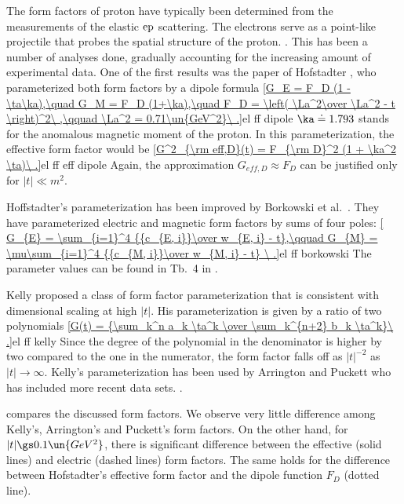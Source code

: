 The form factors of proton have typically been determined from the measurements of the elastic $\rm ep$ scattering. The electrons serve as a point-like projectile that probes the spatial structure of the proton. .
This has been a number of analyses done, gradually accounting for the increasing amount of experimental data. One of the first results was the paper of Hofstadter , who parameterized both form factors by a dipole formula
\eqref{G_E = F_D (1 - \ta\ka),\quad G_M = F_D (1+\ka),\quad F_D = \left( \La^2\over \La^2 - t \right)^2\ ,\qquad \La^2 = 0.71\un{GeV^2}\ .}{el ff dipole}
$\ka\doteq 1.793$ stands for the anomalous magnetic moment of the proton. In this parameterization, the effective form factor would be
\eqref{G^2_{\rm eff,D}(t) = F_{\rm D}^2 (1 + \ka^2 \ta)\ .}{el ff eff dipole}
Again, the approximation $G_{eff,D}\approx F_D$ can be justified only for $|t| \ll m^2$.

Hoffstadter's parameterization has been improved by Borkowski et al.~. They have parameterized electric and magnetic form factors by sums of four poles:
\eqref{
G_{E} = \sum_{i=1}^4 {{c_{E, i}}\over w_{E, i} - t},\qquad
G_{M} = \mu\sum_{i=1}^4 {{c_{M, i}}\over w_{M, i} - t}
\ .}{el ff borkowski}
The parameter values can be found in Tb.~4 in .

Kelly  proposed a class of form factor parameterization that is consistent with dimensional scaling at high $|t|$. His parameterization is given by a ratio of two polynomials
\eqref{G(t) = {\sum_k^n a_k \ta^k \over \sum_k^{n+2} b_k \ta^k}\ .}{el ff kelly}
Since the degree of the polynomial in the denominator is higher by two compared to the one in the numerator, the form factor falls off as $|t|^{-2}$ as $|t|\to\infty$. Kelly's parameterization has been used by Arrington  and Puckett  who has included more recent data sets. .

 compares the discussed form factors. We observe very little difference among Kelly's, Arrington's and Puckett's form factors. On the other hand, for $|t| \gs 0.1\un{GeV^2}$, there is significant difference between the effective (solid lines) and electric (dashed lines) form factors. The same holds for the difference between Hofstadter's effective form factor and the dipole function $F_D$ (dotted line).


